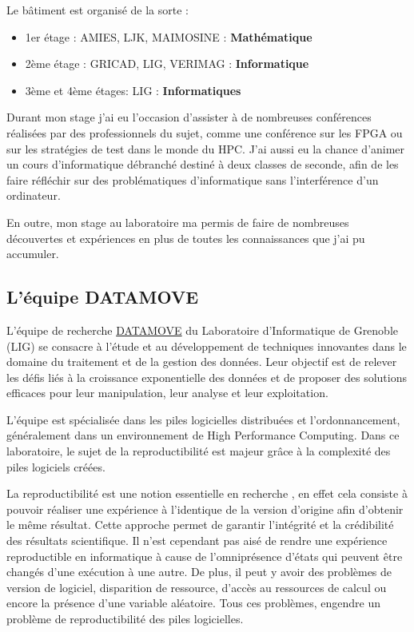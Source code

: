 \documentclass[a4paper,french,12pt, titlepage]{article}
\begin{document}
Le bâtiment est organisé de la sorte :

\begin{itemize}
\item
  1er étage : AMIES, LJK, MAIMOSINE : \textbf{Mathématique}
\item
  2ème étage : GRICAD, LIG, VERIMAG : \textbf{Informatique}
\item
  3ème et 4ème étages: LIG : \textbf{Informatiques}\newline
\end{itemize}

Durant mon stage j'ai eu l'occasion d'assister à de nombreuses
conférences réalisées par des professionnels du sujet, comme une
conférence sur les FPGA ou sur les stratégies de test dans le monde du
HPC. J'ai aussi eu la chance d'animer un cours d'informatique débranché
destiné à deux classes de seconde, afin de les faire réfléchir sur des
problématiques d'informatique sans l'interférence d'un
ordinateur.\newline

En outre, mon stage au laboratoire ma permis de faire de nombreuses
découvertes et expériences en plus de toutes les connaissances que j'ai
pu accumuler.

\hypertarget{luxe9quipe-datamove}{%
\subsection{L'équipe DATAMOVE}\label{luxe9quipe-datamove}}

L'équipe de recherche \href{https://www.inria.fr/fr/datamove}{DATAMOVE}
du Laboratoire d'Informatique de Grenoble (LIG) se consacre à l'étude et
au développement de techniques innovantes dans le domaine du traitement
et de la gestion des données. Leur objectif est de relever les défis
liés à la croissance exponentielle des données et de proposer des
solutions efficaces pour leur manipulation, leur analyse et leur
exploitation.\newline

L'équipe est spécialisée dans les piles logicielles distribuées et
l'ordonnancement, généralement dans un environnement de High Performance
Computing. Dans ce laboratoire, le sujet de la \gls{reproductibilité}
est majeur grâce à la complexité des piles logiciels créées.\newline

La reproductibilité est une notion essentielle en recherche
\cite{reproductibility2017}, en effet cela consiste à pouvoir réaliser
une expérience à l'identique de la version d'origine afin d'obtenir le
même résultat. Cette approche permet de garantir l'intégrité et la
crédibilité des résultats scientifique. Il n'est cependant pas aisé de
rendre une expérience reproductible en informatique à cause de
l'omniprésence d'états qui peuvent être changés d'une exécution à une
autre. De plus, il peut y avoir des problèmes de version de logiciel,
disparition de ressource, d'accès au ressources de calcul ou encore la
présence d'une variable aléatoire. Tous ces problèmes, engendre un
problème de reproductibilité des piles logicielles.\newline
\end{document}
